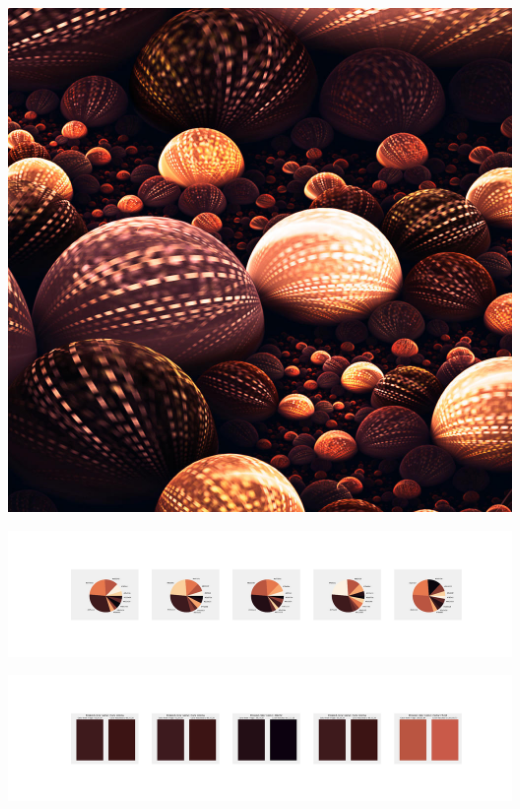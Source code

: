 \documentclass[11pt]{article}
\begin{document}
\begin{landscape}
    \begin{center}
    \includegraphics[width=\textwidth]{./nbimg/file (277).jpg}
    \end{center}

    \begin{center}
    \includegraphics[width=250mm]{./nbimg/pie-197.jpg}
    \end{center}

    \begin{center}
    \includegraphics[width=250mm]{./nbimg/peak-197.jpg}
    \end{center}
    


\end{landscape}
\end{document}
